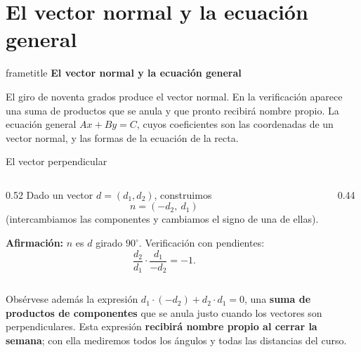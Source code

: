 \documentclass[aspectratio=169,10pt]{beamer}
\newcommand{\destaca}[1]{%
  \par\vspace{3pt}\noindent
  \colorbox{turquesaClaro}{%
    \parbox{\dimexpr\linewidth-2\fboxsep\relax}{\vspace{3pt}#1\vspace{3pt}}}%
  \par\vspace{3pt}}
\newcommand{\hojaSesion}[2]{%
  \vfill
  \begin{beamercolorbox}[wd=\textwidth,sep=16pt,center]{frametitle}
    {\Large\bfseries #1}\\[11pt]
    \begin{minipage}{0.82\textwidth}\centering\small #2\end{minipage}
  \end{beamercolorbox}
  \vfill}
\begin{document}
\section{El vector normal y la ecuación general}
\begin{frame}[plain]
  \hojaSesion{El vector normal y la ecuación general}{%
  El giro de noventa grados produce el vector normal. En la
  verificación aparece una suma de productos que se anula y que pronto
  recibirá nombre propio. La ecuación general $Ax+By=C$, cuyos
  coeficientes son las coordenadas de un vector normal, y las formas de
  la ecuación de la recta.}
\end{frame}
\begin{frame}{El vector perpendicular}
  \begin{columns}[T]
    \begin{column}{0.52\textwidth}
      Dado un vector $d=(d_1,d_2)$, construimos
      \[
        n=(-d_2,\ d_1)
      \]
      (intercambiamos las componentes y cambiamos el signo de una de
      ellas).

      \vspace{0.2cm}

      \textbf{Afirmación:} $n$ es $d$ girado $90^\circ$.
      Verificación con pendientes:
      \[
        \frac{d_2}{d_1}\cdot\frac{d_1}{-d_2}=-1 .
      \]
    \end{column}
    \begin{column}{0.44\textwidth}
      \begin{center}
      \end{center}
    \end{column}
  \end{columns}

  \vspace{0.2cm}
  \destaca{Obsérvese además la expresión
  $d_1\cdot(-d_2)+d_2\cdot d_1=0$, una \textbf{suma de productos de
  componentes} que se anula justo cuando los vectores son
  perpendiculares. Esta expresión \textbf{recibirá nombre propio al cerrar la
  semana}; con ella mediremos todos los ángulos y todas las
  distancias del curso.}
\end{frame}
\end{document}

